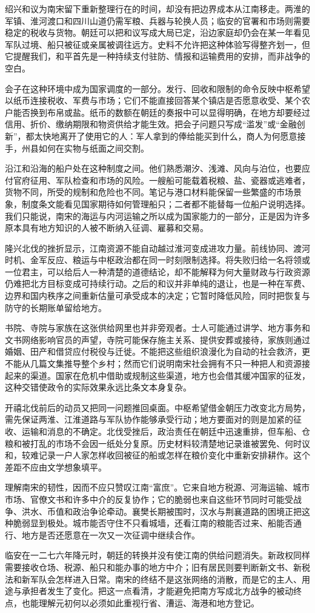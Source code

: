 绍兴和议为南宋留下重新整理行在的时间，却没有把边界成本从江南移走。两淮的军镇、淮河渡口和四川山道仍需军粮、兵器与轮换人员；临安的官署和市场则需要稳定的税收与货物。朝廷可以把和议写成大局已定，沿边家庭却仍会在某一年看见军队过境、船只被征或亲属被调往远方。史料不允许把这种体验写得整齐划一，但它提醒我们，和平首先是一种持续支付驻防、情报和运输费用的安排，而非战争的空白。

会子在这种环境中成为国家调度的一部分。发行、回收和限制的命令反映中枢希望以纸币连接税收、军费与市场；它们不能直接回答某个镇店是否愿意收受、某个农户能否换到布帛或盐。纸币的数额在朝廷的奏报中可以显得明确，在地方却要经过信用、折价、缴纳期限和物资供给才能生效。把会子问题只写成“滥发”或“金融创新”，都太快地离开了使用它的人：军人拿到的俸给能买到什么，商人为何愿意接手，州县如何在实物与纸面之间交割。

沿江和沿海的船户处在这种制度之间。他们熟悉潮汐、浅滩、风向与泊位，也要应付官府征用、军队检查和市场的风险。一艘船可能载着税粮、盐、瓷器或逃难者，货物不同，所受的规制和危险也不同。笔记与港口材料能保留一些繁盛的市场景象，制度条文能看见国家期待如何管理船只；二者都不能替每一位船户说明选择。我们只能说，南宋的海运与内河运输之所以成为国家能力的一部分，正是因为许多原本具有地方知识的人被不断纳入征调、雇募和交易。

隆兴北伐的挫折显示，江南资源不能自动越过淮河变成进攻力量。前线协同、渡河时机、金军反应、粮运与中枢政治都在同一时刻限制选择。将失败归给一名将领或一位君主，可以给后人一种清楚的道德结论，却不能解释为何大量财政与行政资源仍难把北方目标变成可持续行动。之后的和议并非单纯的退让，也是一种在军费、边界和国内秩序之间重新估量可承受成本的决定；它暂时降低风险，同时把恢复与防守的长期账单留给地方。

书院、寺院与家族在这张供给网里也并非旁观者。士人可能通过讲学、地方事务和文书网络影响官员的声望，寺院可能保存施主关系、提供安葬或接待，家族则通过婚姻、田产和借贷应付税役与迁徙。不能把这些组织浪漫化为自动的社会救济，更不能从几篇文集推导整个乡村；然而它们说明南宋社会拥有不只一种把人和资源接起来的渠道。国家在危机中借助或规制这些渠道，地方也会借其缓冲国家的征发，这种交错使政令的实际效果永远比条文本身复杂。

开禧北伐前后的动员又把同一问题推回桌面。中枢希望借金朝压力改变北方局势，需先保证两淮、江淮道路与军队协作能够承受行动；地方要面对的则是加紧的征收、运输和消息的不确定。北伐受挫后，政治责任在朝廷中迅速重排，但车船、仓粮和被打乱的市场不会因一纸处分复原。历史材料较清楚地记录谁被罢免、何时议和，较难记录一户人家怎样收回被征的船或怎样在粮价变化中重新安排耕作。这个差距不应由文学想象填平。

理解南宋的韧性，因而不应只赞叹江南“富庶”。它来自地方税源、河海运输、城市市场、官僚文书和许多中介的反复协作；它的脆弱也来自这些环节同时可能受战争、洪水、币值和政治争论牵动。襄樊长期被围时，汉水与荆襄道路的困境正把这种脆弱显到极处。城市能否守住不只看城墙，还看江南的粮能否过来、船能否通行、地方是否还愿意在一次又一次征调中继续合作。

临安在一二七六年降元时，朝廷的转换并没有使江南的供给问题消失。新政权同样需要接收仓场、税源、船只和能办事的地方中介；旧有居民则要判断新文书、新税法和新军队会怎样进入日常。南宋的终结不是这张网络的消散，而是它的主人、用途与承担者发生了变化。把这一点看清，才能避免把南方写成北方战争的被动终点，也能理解元初何以必须如此重视行省、漕运、海港和地方登记。

